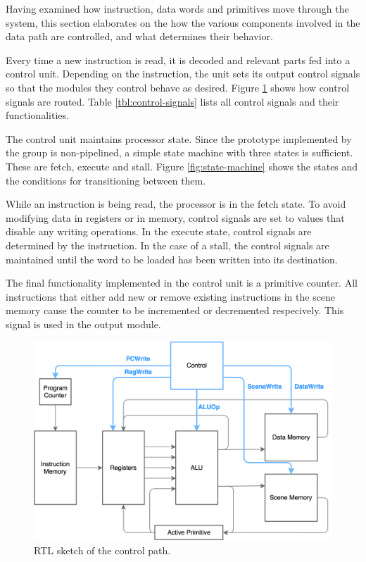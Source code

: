 Having examined how instruction, data words and primitives move through the system, this section elaborates on the how the various components involved in the data path are controlled, and what determines their behavior.

Every time a new instruction is read, it is decoded and relevant parts fed into a control unit. 
Depending on the instruction, the unit sets its output control signals so that the modules they control behave as desired.
Figure \ref{fig:controlpath} shows how control signals are routed.
Table \ref{tbl:control-signals} lists all control signals and their functionalities.

The control unit maintains processor state.
Since the prototype implemented by the group is non-pipelined, a simple state machine with three states is sufficient.
These are fetch, execute and stall.
Figure \ref{fig:state-machine} shows the states and the conditions for transitioning between them.

While an instruction is being read, the processor is in the fetch state.
To avoid modifying data in registers or in memory, control signals are set to values that disable any writing operations.
In the execute state, control signals are determined by the instruction.
In the case of a stall, the control signals are maintained until the word to be loaded has been written into its destination.

The final functionality implemented in the control unit is a primitive counter.
All instructions that either add new or remove existing instructions in the scene memory cause the counter to be incremented or decremented respecively.
This signal is used in the output module.

\begin{figure}[h!]
    \includegraphics[width=\linewidth]{images/Control_signals.png}
    \caption{RTL sketch of the control path.}
    \label{fig:controlpath}
\end{figure}

